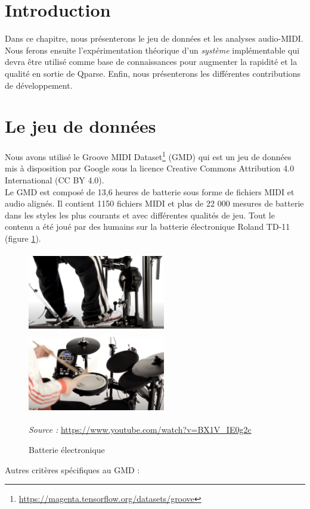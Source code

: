 \section*{Introduction}
Dans ce chapitre, nous présenterons le jeu de données et les analyses audio-MIDI. Nous ferons ensuite l’expérimentation théorique d’un \textit{système} implémentable qui devra être utilisé comme base de connaissances pour augmenter la rapidité et la qualité en sortie de Qparse. Enfin, nous présenterons les différentes contributions de développement.
\section{Le jeu de données}
Nous avons utilisé le Groove MIDI Dataset\footnote{\url{https://magenta.tensorflow.org/datasets/groove}} \cite{groove2019} (GMD) qui est un jeu de données mis à disposition par Google sous la licence Creative Commons Attribution 4.0 International (CC BY 4.0).\\
Le GMD est composé de 13,6 heures de batterie sous forme de fichiers MIDI et audio alignés. Il contient 1150 fichiers MIDI et plus de 22 000 mesures de batterie dans les styles les plus courants et avec différentes qualités de jeu. Tout le contenu a été joué par des humains sur la batterie électronique Roland TD-11 (figure \ref{electro_drums}).\newpage
\begin{figure}[h]
	\centering
	\includegraphics[height=35mm, width=60mm]{z_images/4_experimentations/0_groove/0_roland.png}\ \ 
	\includegraphics[height=35mm, width=60mm]{z_images/4_experimentations/0_groove/1_roland.png}
	\caption{Batterie électronique}
	\label{electro_drums}
	\textit{Source :} \url{https://www.youtube.com/watch?v=BX1V_IE0g2c}
\end{figure}
Autres critères spécifiques au GMD :
